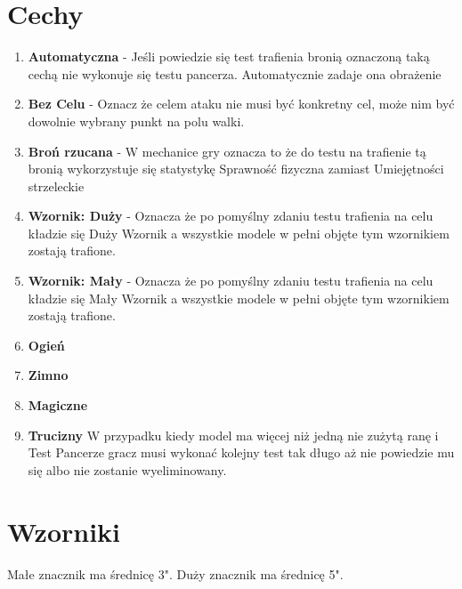 \section{Cechy}
\begin{enumerate}
    \item \textbf{Automatyczna}  \label{sec:link_bron_Automatyczna} - Jeśli powiedzie się test trafienia bronią oznaczoną taką cechą nie wykonuje się testu pancerza. Automatycznie zadaje ona obrażenie
    \item \textbf{Bez Celu}  \label{sec:link_bron_BezCelu} - Oznacz że celem ataku nie musi być konkretny cel, może nim być dowolnie wybrany punkt na polu walki.
    \item \textbf{Broń rzucana}  \label{sec:link_bron_BronRzucana} - W mechanice gry oznacza to że do testu na trafienie tą bronią wykorzystuje się statystykę Sprawność fizyczna zamiast Umiejętności strzeleckie
    \item \textbf{Wzornik: Duży}  \label{sec:link_bron_WzornikDuzy} - Oznacza że po pomyślny zdaniu testu trafienia na celu kładzie się Duży Wzornik a wszystkie modele w pełni objęte tym wzornikiem zostają trafione. 
    \item \textbf{Wzornik: Mały}  \label{sec:link_bron_WzornikMaly} - Oznacza że po pomyślny zdaniu testu trafienia na celu kładzie się Mały Wzornik a wszystkie modele w pełni objęte tym wzornikiem zostają trafione. 
    \item \textbf{Ogień}  \label{sec:link_bron_Ogien}
    \item \textbf{Zimno}  \label{sec:link_bron_Zimno}
    \item \textbf{Magiczne}  \label{sec:link_bron_Magiczne}
    \item \textbf{Trucizny}  \label{sec:link_bron_Trucizny} W przypadku kiedy model ma więcej niż jedną nie zużytą ranę i Test Pancerze gracz musi wykonać kolejny test tak długo aż nie powiedzie mu się albo nie zostanie wyeliminowany. 
\end{enumerate}

\section{Wzorniki}
  \label{sec:link_bron_Automatyczna} Małe znacznik ma średnicę 3". 
  \label{sec:link_bron_Automatyczna} Duży znacznik ma średnicę 5".
